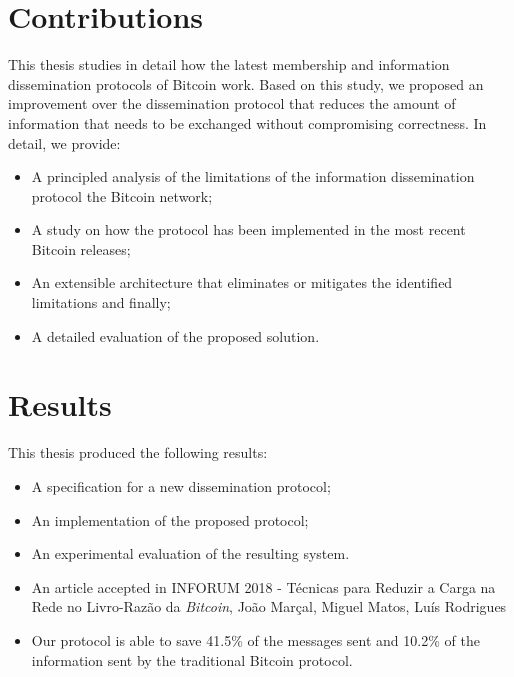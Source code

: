\section{Contributions}
\label{chap:contributions}
This thesis studies in detail how the latest membership and information dissemination protocols of Bitcoin work. Based on this study, we proposed an improvement over the dissemination protocol that reduces the amount of information that needs to be exchanged without compromising correctness. In detail, we provide:
\begin{itemize}
    \item A principled analysis of the limitations of the information dissemination protocol the Bitcoin network;
    \item A study on how the protocol has been implemented in the most recent Bitcoin releases;
    \item An extensible architecture that eliminates or mitigates the identified limitations and finally;
    \item A detailed evaluation of the proposed solution.
\end{itemize}

\section{Results}
\label{chap:results}

This thesis produced the following results:
\begin{itemize}
  \item A specification for a new dissemination protocol;
  \item An implementation of the proposed protocol;
  \item An experimental evaluation of the resulting system.
  \item An article accepted in INFORUM 2018 - Técnicas para Reduzir a Carga na Rede no Livro-Razão da \emph{Bitcoin}, João Marçal, Miguel Matos, Luís Rodrigues
  \item Our protocol is able to save 41.5\% of the messages sent and 10.2\% of the information sent by the traditional Bitcoin protocol.
\end{itemize}

